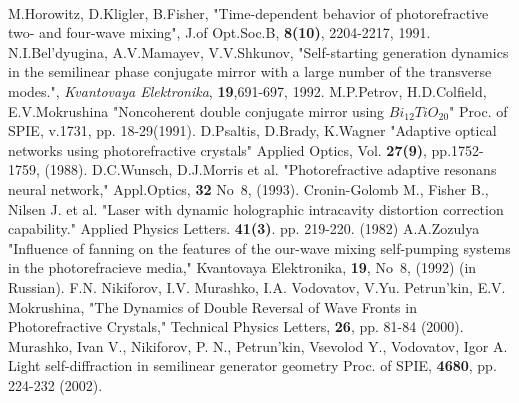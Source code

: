 {\small
\
\begin{thebibliography}{99}

M.Horowitz, D.Kligler, B.Fisher,{
"Time-dependent behavior of photorefractive two- and four-wave
mixing"}, J.of Opt.Soc.B, {\bf 8(10)}, 2204-2217, 1991.
 N.I.Bel'dyugina, A.V.Mamayev,
V.V.Shkunov, "Self-starting generation dynamics in the semilinear
phase conjugate mirror with a large number of the transverse
modes.", {\it Kvantovaya Elektronika}, {\bf 19},691-697, 1992.
 M.P.Petrov, H.D.Colfield, E.V.Mokrushina
{"Noncoherent double conjugate mirror using $Bi_{12}TiO_{20}$"}
Proc. of SPIE, v.1731, pp. 18-29(1991).
 D.Psaltis, D.Brady, K.Wagner {"Adaptive
optical networks using photorefractive crystals"} Applied Optics,
Vol. {\bf 27(9)}, pp.1752-1759, (1988).
  D.C.Wunsch, D.J.Morris et al. {"Photorefractive adaptive
  resonans neural 
network,"} Appl.Optics, {\bf 32} No~8, (1993).
  Cronin-Golomb M., Fisher B., Nilsen J. et al.
{"Laser with dynamic holographic intracavity distortion correction
capability."}  Applied Physics Letters. {\bf
  41(3)}. pp. 219-220. (1982)
 A.A.Zozulya {"Influence of fanning on the features
of the our-wave mixing self-pumping systems in the photorefracieve
media,"} Kvantovaya Elektronika, {\bf 19}, No~8, (1992) (in
Russian).
 F.N. Nikiforov, I.V. Murashko,
I.A. Vodovatov, V.Yu. Petrun'kin, E.V. Mokrushina, "The Dynamics
of Double Reversal of Wave Fronts in Photorefractive Crystals,"
Technical Physics Letters, {\bf 26}, pp. 81-84 (2000).
 Murashko, Ivan V., Nikiforov, P. N., Petrun'kin, Vsevolod Y., Vodovatov, Igor A. 
Light self-diffraction in semilinear generator geometry 
Proc. of SPIE, {\bf 4680}, pp. 224-232 (2002).
\end{thebibliography}
} %
